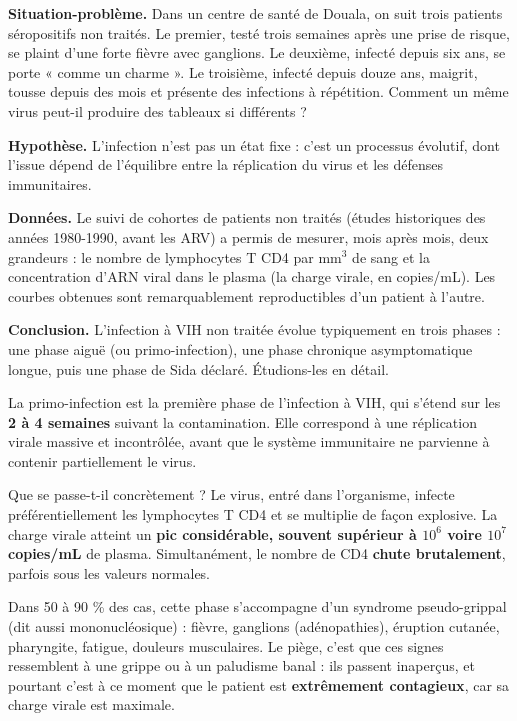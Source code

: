 \documentclass[11pt]{article}
\newcommand{\cle}[1]{{\popxbold\color{popdark}#1}}
\newcounter{popsec}
\newcounter{popsub}
\newcommand{\courssub}[1]{%
  \stepcounter{popsub}%
  \par\vspace{9pt}\noindent{\popxbold\fontsize{11.5}{13}\selectfont\color{popink}{\color{poporange}\thepopsec.\thepopsub}\hspace{6pt}#1}\par\nopagebreak\vspace{4pt}
}
\begin{document}
\textbf{Situation-problème.} Dans un centre de santé de Douala, on suit trois patients séropositifs non traités. Le premier, testé trois semaines après une prise de risque, se plaint d'une forte fièvre avec ganglions. Le deuxième, infecté depuis six ans, se porte « comme un charme ». Le troisième, infecté depuis douze ans, maigrit, tousse depuis des mois et présente des infections à répétition. Comment un même virus peut-il produire des tableaux si différents ?

\textbf{Hypothèse.} L'infection n'est pas un état fixe : c'est un processus évolutif, dont l'issue dépend de l'équilibre entre la réplication du virus et les défenses immunitaires.

\textbf{Données.} Le suivi de cohortes de patients non traités (études historiques des années 1980-1990, avant les ARV) a permis de mesurer, mois après mois, deux grandeurs : le nombre de lymphocytes T CD4 par mm$^3$ de sang et la concentration d'ARN viral dans le plasma (la charge virale, en copies/mL). Les courbes obtenues sont remarquablement reproductibles d'un patient à l'autre.

\textbf{Conclusion.} L'infection à VIH non traitée évolue typiquement en trois phases : une \cle{phase aiguë} (ou primo-infection), une \cle{phase chronique asymptomatique} longue, puis une \cle{phase de Sida déclaré}. Étudions-les en détail.

\courssub{Phase 1 : l'infection aiguë (primo-infection)}

\begin{definition}
La \cle{primo-infection} est la première phase de l'infection à VIH, qui s'étend sur les \textbf{2 à 4 semaines} suivant la contamination. Elle correspond à une réplication virale massive et incontrôlée, avant que le système immunitaire ne parvienne à contenir partiellement le virus.
\end{definition}

Que se passe-t-il concrètement ? Le virus, entré dans l'organisme, infecte préférentiellement les lymphocytes T CD4 et se multiplie de façon explosive. La \cle{charge virale} atteint un \textbf{pic considérable, souvent supérieur à $10^6$ voire $10^7$ copies/mL} de plasma. Simultanément, le nombre de CD4 \textbf{chute brutalement}, parfois sous les valeurs normales.

Dans 50 à 90 \% des cas, cette phase s'accompagne d'un \cle{syndrome pseudo-grippal} (dit aussi mononucléosique) : fièvre, ganglions (adénopathies), éruption cutanée, pharyngite, fatigue, douleurs musculaires. Le piège, c'est que ces signes ressemblent à une grippe ou à un paludisme banal : ils passent inaperçus, et pourtant c'est à ce moment que le patient est \textbf{extrêmement contagieux}, car sa charge virale est maximale.
\end{document}
